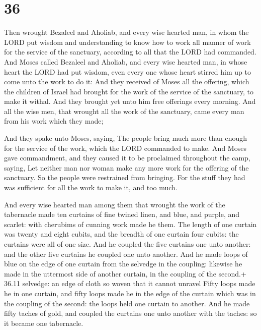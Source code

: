 \hypertarget{section-35}{%
\section{36}\label{section-35}}

 Then wrought Bezaleel and Aholiab, and every wise hearted
man, in whom the LORD put wisdom and understanding to know how to work
all manner of work for the service of the sanctuary, according to all
that the LORD had commanded.  And Moses called Bezaleel and
Aholiab, and every wise hearted man, in whose heart the LORD had put
wisdom, even every one whose heart stirred him up to come unto the work
to do it:  And they received of Moses all the offering,
which the children of Israel had brought for the work of the service of
the sanctuary, to make it withal. And they brought yet unto him free
offerings every morning.  And all the wise men, that wrought
all the work of the sanctuary, came every man from his work which they
made;

 And they spake unto Moses, saying, The people bring much
more than enough for the service of the work, which the LORD commanded
to make.  And Moses gave commandment, and they caused it to
be proclaimed throughout the camp, saying, Let neither man nor woman
make any more work for the offering of the sanctuary. So the people were
restrained from bringing.  For the stuff they had was
sufficient for all the work to make it, and too much.

 And every wise hearted man among them that wrought the
work of the tabernacle made ten curtains of fine twined linen, and blue,
and purple, and scarlet: with cherubims of cunning work made he them.
 The length of one curtain was twenty and eight cubits, and
the breadth of one curtain four cubits: the curtains were all of one
size.  And he coupled the five curtains one unto another:
and the other five curtains he coupled one unto another. 
And he made loops of blue on the edge of one curtain from the selvedge
in the coupling: likewise he made in the uttermost side of another
curtain, in the coupling of the second.+ 36.11 selvedge: an edge of
cloth so woven that it cannot unravel  Fifty loops made he
in one curtain, and fifty loops made he in the edge of the curtain which
was in the coupling of the second: the loops held one curtain to
another.  And he made fifty taches of gold, and coupled the
curtains one unto another with the taches: so it became one tabernacle.

